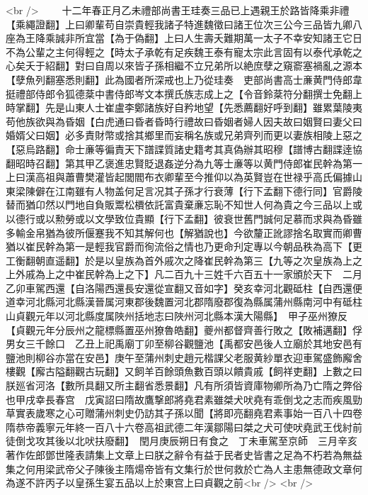 <br />
　　十二年春正月乙未禮部尚書王珪奏三品已上遇親王於路皆降乘非禮【乘繩證翻】上曰卿輩苟自崇貴輕我諸子特進魏徵曰諸王位次三公今三品皆九卿八座為王降乘誠非所宜當【為于偽翻】上曰人生壽夭難期萬一太子不幸安知諸王它日不為公輩之主何得輕之【時太子承乾有足疾魏王泰有寵太宗此言固有以泰代承乾之心矣夭于紹翻】對曰自周以來皆子孫相繼不立兄弟所以絶庶孽之窺窬塞禍亂之源本【孽魚列翻塞悉則翻】此為國者所深戒也上乃從珪奏　吏部尚書高士亷黄門侍郎韋挺禮部侍郎令狐德棻中書侍郎岑文本撰氏族志成上之【令音鈴棻符分翻撰士免翻上時掌翻】先是山東人士崔盧李鄭諸族好自矜地望【先悉薦翻好呼到翻】雖累葉陵夷苟他族欲與為昏姻【白虎通曰昏者昏時行禮故曰昏姻者婦人因夫故曰姻賢曰妻父曰婚婿父曰姻】必多責財幣或捨其鄉里而妄稱名族或兄弟齊列而更以妻族相陵上惡之【惡烏路翻】命士亷等徧責天下譜諜質諸史籍考其真偽辦其昭穆【譜博古翻諜逹協翻昭時召翻】第其甲乙褒進忠賢貶退姦逆分為九等士亷等以黄門侍郎崔民幹為第一上曰漢高祖與蕭曹樊灌皆起閭閻布衣卿輩至今推仰以為英賢豈在世禄乎高氏偏據山東梁陳僻在江南雖有人物盖何足言况其子孫才行衰薄【行下孟翻下德行同】官爵陵替而猶卬然以門地自負販鬻松檟依託富貴棄亷忘恥不知世人何為貴之今三品以上或以德行或以勲勞或以文學致位貴顯【行下孟翻】彼衰世舊門誠何足慕而求與為昏雖多輸金帛猶為彼所偃蹇我不知其解何也【解猶說也】今欲釐正訛謬捨名取實而卿曹猶以崔民幹為第一是輕我官爵而徇流俗之情也乃更命刋定專以今朝品秩為高下【更工衡翻朝直遥翻】於是以皇族為首外戚次之降崔民幹為第三【九等之次皇族為上之上外戚為上之中崔民幹為上之下】凡二百九十三姓千六百五十一家頒於天下　二月乙卯車駕西還【自洛陽西還長安還從宣翻又音如字】癸亥幸河北觀砥柱【自西還便道幸河北縣河北縣漢晉属河東郡後魏置河北郡隋廢郡復為縣属蒲州縣南河中有砥柱山貞觀元年以河北縣度属陜州括地志曰陜州河北縣本漢大陽縣】　甲子巫州獠反【貞觀元年分辰州之龍標縣置巫州獠魯皓翻】夔州都督齊善行敗之【敗補邁翻】俘男女三千餘口　乙丑上祀禹廟丁卯至柳谷觀鹽池【禹都安邑後人立廟於其地安邑有鹽池則柳谷亦當在安邑】庚午至蒲州刺史趙元楷課父老服黄紗單衣迎車駕盛飾廨舍樓觀【廨古隘翻觀古玩翻】又飼羊百餘頭魚數百頭以饋貴戚【飼祥吏翻】上數之曰朕廵省河洛【數所具翻又所主翻省悉景翻】凡有所須皆資庫物卿所為乃亡隋之弊俗也甲戌幸長春宫　戊寅詔曰隋故鷹撃郎將堯君素雖桀犬吠堯有乖倒戈之志而疾風勁草實表歲寒之心可贈蒲州刺史仍訪其子孫以聞【將即亮翻堯君素事始一百八十四卷隋恭帝義寧元年終一百八十六卷高祖武德二年漢鄒陽曰桀之犬可使吠堯武王伐紂前徒倒戈攻其後以北吠扶廢翻】　閏月庚辰朔日有食之　丁未車駕至京師　三月辛亥著作佐郎鄧世隆表請集上文章上曰朕之辭令有益于民者史皆書之足為不朽若為無益集之何用梁武帝父子陳後主隋煬帝皆有文集行於世何救於亡為人主患無德政文章何為遂不許丙子以皇孫生宴五品以上於東宫上曰貞觀之前<br />
<br />
